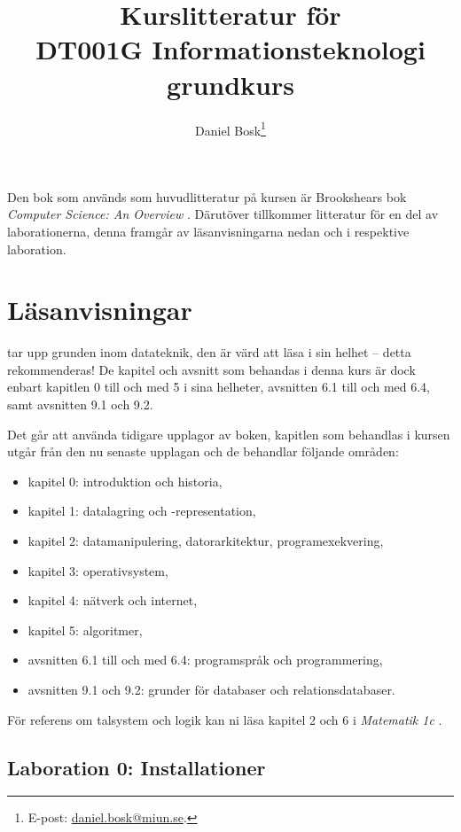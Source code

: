 \documentclass[a4paper,logo]{miunart}
\title{Kurslitteratur för\\DT001G Informationsteknologi grundkurs}
\author{Daniel Bosk\footnote{%
	E-post: \href{mailto:daniel.bosk@miun.se}{daniel.bosk@miun.se}.
}}
\date{\svnId}
\begin{document}
\maketitle
\noindent
Den bok som används som huvudlitteratur på kursen är Brookshears bok 
\emph{Computer Science: An Overview} \citep{Brookshear2012csa}.
Därutöver tillkommer litteratur för en del av laborationerna, denna framgår av 
läsanvisningarna nedan och i respektive laboration.


\section*{Läsanvisningar}
\noindent
\citet{Brookshear2012csa} tar upp grunden inom datateknik, den är värd att läsa 
i sin helhet -- detta rekommenderas!
De kapitel och avsnitt som behandas i denna kurs är dock enbart kapitlen 0 till 
och med 5 i sina helheter, avsnitten 6.1 till och med 6.4, samt avsnitten 9.1 
och 9.2.

Det går att använda tidigare upplagor av boken, kapitlen som behandlas i kursen 
utgår från den nu senaste upplagan \citep{Brookshear2012csa} och de behandlar 
följande områden:
\begin{itemize}
	\item kapitel 0: introduktion och historia,
	\item kapitel 1: datalagring och -representation,
	\item kapitel 2: datamanipulering, datorarkitektur, programexekvering,
	\item kapitel 3: operativsystem,
	\item kapitel 4: nätverk och internet,
	\item kapitel 5: algoritmer,
	\item avsnitten 6.1 till och med 6.4: programspråk och programmering,
	\item avsnitten 9.1 och 9.2: grunder för databaser och relationsdatabaser.
\end{itemize}

För referens om talsystem och logik kan ni läsa kapitel 2 och 
6 i \emph{Matematik 1c} \citep{Bosk2011m1c}.


\subsection*{Laboration 0: Installationer}
\noindent

\end{document}

